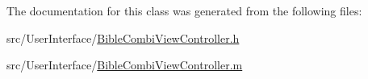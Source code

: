 The documentation for this class was generated from the following files\-:\begin{DoxyCompactItemize}
\item 
src/\-User\-Interface/\hyperlink{_bible_combi_view_controller_8h}{Bible\-Combi\-View\-Controller.\-h}\item 
src/\-User\-Interface/\hyperlink{_bible_combi_view_controller_8m}{Bible\-Combi\-View\-Controller.\-m}\end{DoxyCompactItemize}
